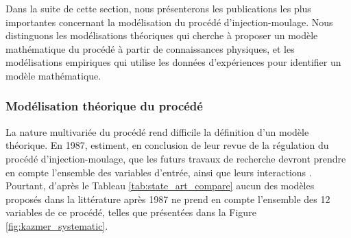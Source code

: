 Dans la suite de cette section, nous présenterons les publications les plus importantes concernant la modélisation du procédé d'injection-moulage.
Nous distinguons les modélisations théoriques qui cherche à proposer un modèle mathématique du procédé à partir de connaissances physiques, et les modélisations empiriques qui utilise les données d'expériences pour identifier un modèle mathématique.


\subsubsection{Modélisation théorique du procédé} \label{subsubsec:molding_theory}
La nature multivariée du procédé rend difficile la définition d'un modèle théorique.
En 1987, \citeauthor{agrawal_injection-molding_1987} estiment, en conclusion de leur revue de la régulation du procédé d'injection-moulage, que les futurs travaux de recherche devront prendre en compte l’ensemble des variables d'entrée, ainsi que leurs interactions \cite{agrawal_injection-molding_1987}.
Pourtant, d'après le Tableau \ref{tab:state_art_compare} aucun des modèles proposés dans la littérature après 1987 ne prend en compte l'ensemble des 12 variables de ce procédé, telles que présentées dans la Figure \ref{fig:kazmer_systematic}.

